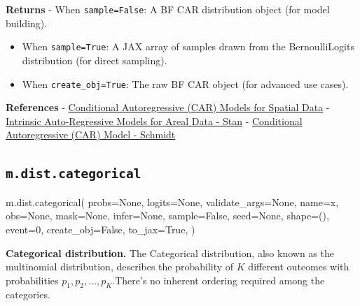 \documentclass[
  letterpaper,
  DIV=11,
  numbers=noendperiod]{scrartcl}
\newenvironment{Shaded}{\begin{snugshade}}{\end{snugshade}}
\newcommand{\DecValTok}[1]{\textcolor[rgb]{0.68,0.00,0.00}{#1}}
\newcommand{\NormalTok}[1]{\textcolor[rgb]{0.00,0.23,0.31}{#1}}
\newcommand{\OperatorTok}[1]{\textcolor[rgb]{0.37,0.37,0.37}{#1}}
\newcommand{\StringTok}[1]{\textcolor[rgb]{0.13,0.47,0.30}{#1}}
\newcommand{\VariableTok}[1]{\textcolor[rgb]{0.07,0.07,0.07}{#1}}
\begin{document}
\textbf{Returns} - When \texttt{sample=False}: A BF CAR distribution
object (for model building).

\begin{itemize}
\item
  When \texttt{sample=True}: A JAX array of samples drawn from the
  BernoulliLogits distribution (for direct sampling).
\item
  When \texttt{create\_obj=True}: The raw BF CAR object (for advanced
  use cases).
\end{itemize}

\textbf{References} -
\href{https://www.pymc.io/projects/examples/en/latest/spatial/conditional_autoregressive_priors.html}{Conditional
Autoregressive (CAR) Models for Spatial Data} -
\href{https://mc-stan.org/learn-stan/case-studies/icar_stan.html}{Intrinsic
Auto-Regressive Models for Areal Data - Stan} -
\href{https://onlinelibrary.wiley.com/doi/abs/10.1002/9781118445112.stat08048}{Conditional
Autoregressive (CAR) Model - Schmidt}

\subsection{\texorpdfstring{\texttt{m.dist.categorical}}{m.dist.categorical}}\label{categorical}

\begin{Shaded}
\begin{Highlighting}[]
\NormalTok{m.dist.categorical(}
\NormalTok{    probs}\OperatorTok{=}\VariableTok{None}\NormalTok{,}
\NormalTok{    logits}\OperatorTok{=}\VariableTok{None}\NormalTok{,}
\NormalTok{    validate\_args}\OperatorTok{=}\VariableTok{None}\NormalTok{,}
\NormalTok{    name}\OperatorTok{=}\StringTok{\textquotesingle{}x\textquotesingle{}}\NormalTok{,}
\NormalTok{    obs}\OperatorTok{=}\VariableTok{None}\NormalTok{,}
\NormalTok{    mask}\OperatorTok{=}\VariableTok{None}\NormalTok{,}
\NormalTok{    infer}\OperatorTok{=}\VariableTok{None}\NormalTok{,}
\NormalTok{    sample}\OperatorTok{=}\VariableTok{False}\NormalTok{,}
\NormalTok{    seed}\OperatorTok{=}\VariableTok{None}\NormalTok{,}
\NormalTok{    shape}\OperatorTok{=}\NormalTok{(),}
\NormalTok{    event}\OperatorTok{=}\DecValTok{0}\NormalTok{,}
\NormalTok{    create\_obj}\OperatorTok{=}\VariableTok{False}\NormalTok{,}
\NormalTok{    to\_jax}\OperatorTok{=}\VariableTok{True}\NormalTok{,}
\NormalTok{)}
\end{Highlighting}
\end{Shaded}

\textbf{Categorical distribution.} The Categorical distribution, also
known as the multinomial distribution, describes the probability of
\(K\) different outcomes with probabilities
\({p_1, p_2, \dots, p_K}\).There's no inherent ordering required among
the categories.
\end{document}
